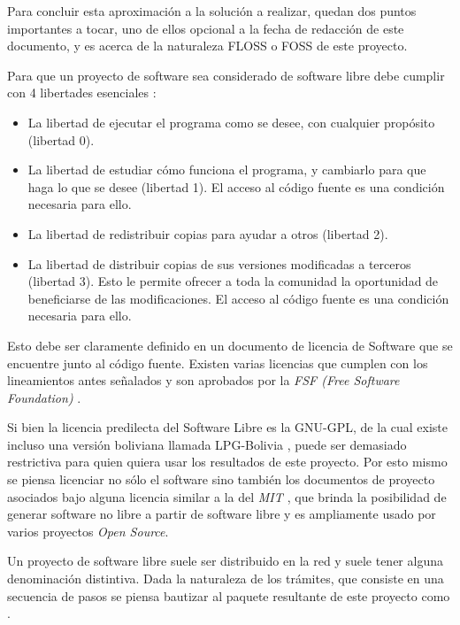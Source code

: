 Para concluir esta aproximación a la solución a realizar, quedan dos puntos
importantes a tocar, uno de ellos opcional a la fecha de redacción de este
documento, y es acerca de la naturaleza FLOSS o FOSS de este proyecto.

Para que un proyecto de software sea considerado de software libre debe cumplir
con 4 libertades esenciales \cite{QueEsSoftware}:

\begin{itemize}
    \item La libertad de ejecutar el programa como se desee, con cualquier
          propósito (libertad 0).

    \item La libertad de estudiar cómo funciona el programa, y cambiarlo para
          que haga lo que se desee (libertad 1). El acceso al código fuente es una
          condición necesaria para ello.

    \item La libertad de redistribuir copias para ayudar a otros (libertad 2).

    \item La libertad de distribuir copias de sus versiones modificadas a
          terceros (libertad 3). Esto le permite ofrecer a toda la comunidad la
          oportunidad de beneficiarse de las modificaciones. El acceso al código
          fuente es una condición necesaria para ello.
\end{itemize}

Esto debe ser claramente definido en un documento de licencia de Software que se
encuentre junto al código fuente. Existen varias licencias que cumplen con los
lineamientos antes señalados y son aprobados por la \textit{FSF (Free Software
    Foundation)} \cite{VariousLicensesComments}.

Si bien la licencia predilecta del Software Libre es la GNU-GPL, de la cual
existe incluso una versión boliviana llamada LPG-Bolivia
\cite{cayoLPGBoliviaADSIB}, puede ser demasiado restrictiva para quien quiera
usar los resultados de este proyecto. Por esto mismo se piensa licenciar no sólo
el software sino también los documentos de proyecto asociados bajo alguna
licencia similar a la del \textit{MIT \cite{MITLicense2006}}, que brinda la posibilidad
de generar software no libre a partir de software libre y es ampliamente usado
por varios proyectos \textit{Open Source}.

Un proyecto de software libre suele ser distribuido en la red y suele tener
alguna denominación distintiva. Dada la naturaleza de los trámites, que consiste
en una secuencia de pasos se piensa bautizar al paquete resultante de este
proyecto como .